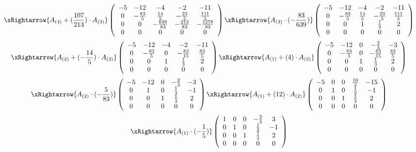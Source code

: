 $$
\xRightarrow{A_{(4)} + (\frac{107}{213}) \cdot A_{(3)}}
\left(
\begin{array}{ccccc}
-5 & -12 & -4 & -2 & -11\\
0 & -\frac{83}{5} & \frac{14}{5} & -\frac{23}{5} & \frac{111}{5}\\
0 & 0 & -\frac{639}{83} & -\frac{213}{83} & -\frac{1278}{83}\\
0 & 0 & 0 & 0 & 0\\
\end{array}
\right)
\xRightarrow{A_{(3)} \cdot (-\frac{83}{639})}
\left(
\begin{array}{ccccc}
-5 & -12 & -4 & -2 & -11\\
0 & -\frac{83}{5} & \frac{14}{5} & -\frac{23}{5} & \frac{111}{5}\\
0 & 0 & 1 & \frac{1}{3} & 2\\
0 & 0 & 0 & 0 & 0\\
\end{array}
\right)
$$
$$
\xRightarrow{A_{(2)} + (-\frac{14}{5}) \cdot A_{(3)}}
\left(
\begin{array}{ccccc}
-5 & -12 & -4 & -2 & -11\\
0 & -\frac{83}{5} & 0 & -\frac{83}{15} & \frac{83}{5}\\
0 & 0 & 1 & \frac{1}{3} & 2\\
0 & 0 & 0 & 0 & 0\\
\end{array}
\right)
\xRightarrow{A_{(1)} + (4) \cdot A_{(3)}}
\left(
\begin{array}{ccccc}
-5 & -12 & 0 & -\frac{2}{3} & -3\\
0 & -\frac{83}{5} & 0 & -\frac{83}{15} & \frac{83}{5}\\
0 & 0 & 1 & \frac{1}{3} & 2\\
0 & 0 & 0 & 0 & 0\\
\end{array}
\right)
$$
$$
\xRightarrow{A_{(2)} \cdot (-\frac{5}{83})}
\left(
\begin{array}{ccccc}
-5 & -12 & 0 & -\frac{2}{3} & -3\\
0 & 1 & 0 & \frac{1}{3} & -1\\
0 & 0 & 1 & \frac{1}{3} & 2\\
0 & 0 & 0 & 0 & 0\\
\end{array}
\right)
\xRightarrow{A_{(1)} + (12) \cdot A_{(2)}}
\left(
\begin{array}{ccccc}
-5 & 0 & 0 & \frac{10}{3} & -15\\
0 & 1 & 0 & \frac{1}{3} & -1\\
0 & 0 & 1 & \frac{1}{3} & 2\\
0 & 0 & 0 & 0 & 0\\
\end{array}
\right)
$$
$$
\xRightarrow{A_{(1)} \cdot (-\frac{1}{5})}
\left(
\begin{array}{ccccc}
1 & 0 & 0 & -\frac{2}{3} & 3\\
0 & 1 & 0 & \frac{1}{3} & -1\\
0 & 0 & 1 & \frac{1}{3} & 2\\
0 & 0 & 0 & 0 & 0\\
\end{array}
\right)
$$